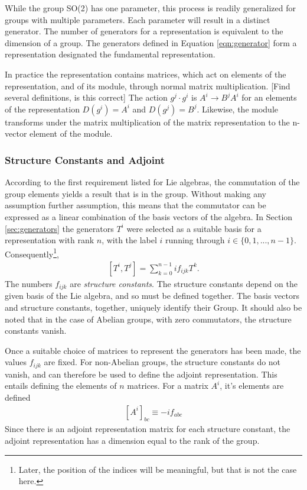 While the group SO(2) has one parameter, this process is readily generalized for groups with multiple parameters. Each parameter will result in a distinct generator.
The number of generators for a representation is equivalent to the dimension of a group.
The generators defined in Equation \ref{eqn:generator} form a representation designated the fundamental representation.

In practice the representation contains \nxn matrices, which act on elements of the representation, and of its module, through normal matrix multiplication. {\color{red} [Find several definitions, is this correct]}
The action $g^j\cdot g^i$ is $A^i\to B^jA^i$ for an elements of the representation $D(g^i)=A^i$ and $D(g^j)=B^j$.
Likewise, the module transforms under the matrix multiplication of the \nxn matrix representation to the n-vector element of the module. \check




\subsubsection{Structure Constants and Adjoint}\label{sec:adjoint}
According to the first requirement listed for Lie algebras, the commutation of the group elements yields a result that is in the group.
Without making any assumption further assumption, this means that the commutator can be expressed as a linear combination of the basis vectors of the algebra.
In Section \ref{sec:generators} the generators $T^i$ were selected as a suitable basis for a representation with rank $n$, with the label $i$ running through $i\in\{0,1,...,n-1\}$.
Consequently\footnote{Later, the position of the indices will be meaningful, but that is not the case here.},
\begin{equation}\begin{split}\label{eqn:structure}
    [T^i,T^j]=\sum_{k=0}^{n-1}if_{ijk}T^k.
\end{split}\end{equation} 
The numbers $f_{ijk}$ are \emph{structure constants}. 
The structure constants depend on the given basis of the Lie algebra, and so must be defined together.
The basis vectors and structure constants, together, uniquely identify their Group.
It should also be noted that in the case of Abelian groups, with zero commutators, the structure constants vanish.

Once a suitable choice of matrices to represent the generators has been made, the values $f_{ijk}$ are fixed.
For non-Abelian groups, the structure constants do not vanish, and can therefore be used to define the adjoint representation.
This entails defining the \nxn elements of $n$ matrices.
For a matrix $A^i$, it's elements are defined
\begin{equation}\begin{split}\label{eqn:adjoint}
[A^i]_{bc}\equiv-if_{abc}
\end{split}\end{equation} 
Since there is an adjoint representation matrix for each structure constant, the adjoint representation has a dimension equal to the rank of the group.


